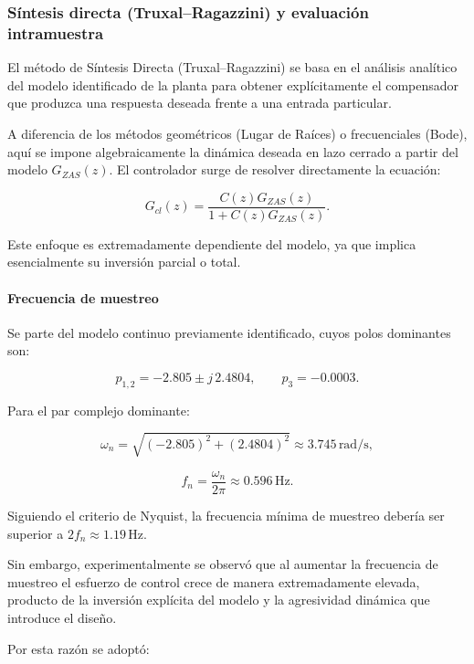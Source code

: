 \subsubsection{Síntesis directa (Truxal--Ragazzini) y evaluación intramuestra}

El método de Síntesis Directa (Truxal--Ragazzini) se basa en el análisis
analítico del modelo identificado de la planta para obtener explícitamente
el compensador que produzca una respuesta deseada frente a una entrada
particular.

A diferencia de los métodos geométricos (Lugar de Raíces) o frecuenciales
(Bode), aquí se impone algebraicamente la dinámica deseada en lazo cerrado
a partir del modelo \(G_{ZAS}(z)\). El controlador surge de resolver
directamente la ecuación:

\[
G_{cl}(z)
=
\frac{C(z)G_{ZAS}(z)}{1 + C(z)G_{ZAS}(z)}.
\]

Este enfoque es extremadamente dependiente del modelo,
ya que implica esencialmente su inversión parcial o total.

\paragraph{Frecuencia de muestreo}

Se parte del modelo continuo previamente identificado,
cuyos polos dominantes son:

\[
p_{1,2} = -2.805 \pm j\,2.4804,
\qquad
p_3 = -0.0003.
\]

Para el par complejo dominante:

\[
\omega_n
=
\sqrt{(-2.805)^2 + (2.4804)^2}
\approx 3.745 \,\text{rad/s},
\]

\[
f_n
=
\frac{\omega_n}{2\pi}
\approx 0.596 \,\text{Hz}.
\]

Siguiendo el criterio de Nyquist, la frecuencia mínima de muestreo
debería ser superior a \(2f_n \approx 1.19\,\text{Hz}\).

Sin embargo, experimentalmente se observó que al aumentar
la frecuencia de muestreo el esfuerzo de control crece
de manera extremadamente elevada, producto de la inversión
explícita del modelo y la agresividad dinámica que introduce
el diseño.

Por esta razón se adoptó:


